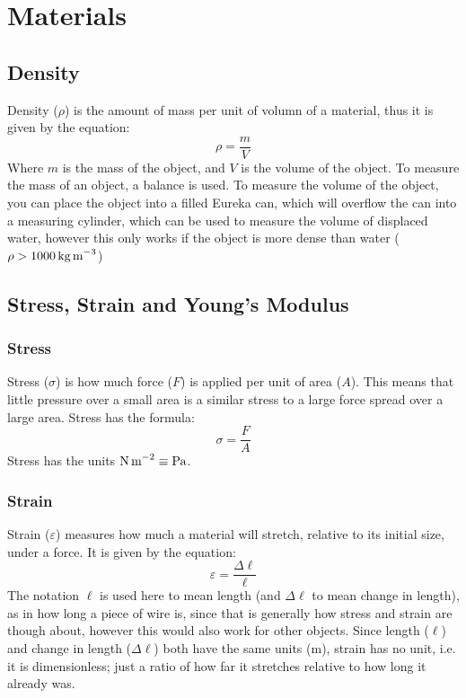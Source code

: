 \section{Materials}
    \subsection{Density}
        Density ($\rho$) is the amount of mass per unit of volumn of a material, thus it is given by the equation:
        \begin{equation}
            \rho=\frac{m}{V}
        \end{equation}
        Where $m$ is the mass of the object, and $V$ is the volume of the object.
        To measure the mass of an object, a balance is used.
        To measure the volume of the object, you can place the object into a filled Eureka can, which will overflow the can into a measuring cylinder, which can be used to measure the volume of displaced water, however this only works if the object is more dense than water ($\rho>1000\,\text{kg\,m}^{-3}$)

    \subsection{Stress, Strain and Young's Modulus}
        \subsubsection{Stress}
            Stress ($\sigma$) is how much force ($F$) is applied per unit of area ($A$).
            This means that little pressure over a small area is a similar stress to a large force spread over a large area.
            Stress has the formula:
            \begin{equation}
                \sigma=\frac{F}{A}
            \end{equation}
            Stress has the units $\text{N\,m}^{-2}\equiv\text{Pa}$.

        \subsubsection{Strain}
            Strain ($\varepsilon$) measures how much a material will stretch, relative to its initial size, under a force.
            It is given by the equation:
            \begin{equation}
                \varepsilon=\frac{\Delta\ell}{\ell}
            \end{equation}
            The notation $\ell$ is used here to mean length (and $\Delta\ell$ to mean change in length), as in how long a piece of wire is, since that is generally how stress and strain are though about, however this would also work for other objects.
            Since length ($\ell$) and change in length ($\Delta\ell$) both have the same units (m), strain has no unit, i.e. it is dimensionless; just a ratio of how far it stretches relative to how long it already was.

